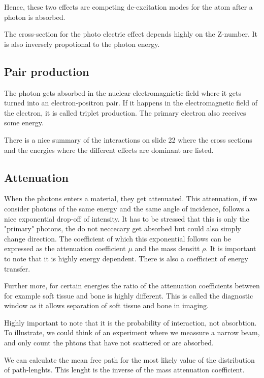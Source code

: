 \documentclass{article}
\begin{document}
Hence, these two effects are competing de-excitation modes for the atom after a photon is absorbed.

The cross-section for the photo electric effect depends highly on the Z-number.
It is also inversely propotional to the photon energy.

\subsection{Pair production}

The photon gets absorbed in the nuclear electromagnietic field where it gets turned into an electron-positron pair. 
If it happens in the electromagnetic field of the electron, it is called triplet production.
The primary electron also receives some energy.

There is a nice summary of the interactions on slide 22 where the cross sections and the energies where the different effects are dominant are listed.


\subsection{Attenuation}

When the photons enters a material, they get attenuated. 
This attenuation, if we consider photons of the same energy and the same angle of incidence, follows a nice exponential drop-off of intensity.
It has to be stressed that this is only the "primary" photons, the do not neccecary get absorbed but could also simply change direction.
The coefficient of which this exponential follows can be expressed as the attenuation coefficient $\mu$ and the mass densitt $\rho$.
It is important to note that it is highly energy dependent.
There is also a coefficient of energy transfer.

Further more, for certain energies the ratio of the attenuation coefficients between for example soft tissue and bone is highly different. This is called the diagnostic window as it allows separation of soft tissue and bone in imaging.

Highly important to note that it is the probability of interaction, not absorbtion. 
To illustrate, we could think of an experiment where we meassure a narrow beam, and only count the phtons that have not scattered or are absorbed.

We can calculate the mean free path for the most likely value of the distribution of path-lenghts.
This lenght is the inverse of the mass attenuation coefficient.
\end{document}
